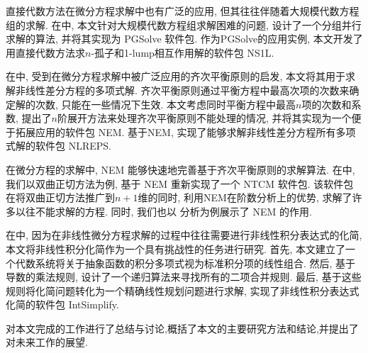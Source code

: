 直接代数方法在微分方程求解中也有广泛的应用, 但其往往伴随着大规模代数方程组的求解. 在中, 本文针对大规模代数方程组求解困难的问题, 设计了一个分组并行求解的算法, 并将其实现为 PGSolve 软件包. 作为PGSolve的应用实例, 本文开发了用直接代数方法求$n$-孤子和1-lump相互作用解的软件包 NS1L. 

在中, 受到在微分方程求解中被广泛应用的齐次平衡原则的启发, 本文将其用于求解非线性差分方程的多项式解. 齐次平衡原则通过平衡方程中最高次项的次数来确定解的次数, 只能在一些情况下生效. 本文考虑同时平衡方程中最高$n$项的次数和系数, 提出了$n$阶展开方法来处理齐次平衡原则不能处理的情况, 并将其实现为一个便于拓展应用的软件包 NEM. 基于NEM, 实现了能够求解非线性差分方程所有多项式解的软件包 NLREPS. 

在微分方程的求解中, NEM 能够快速地完善基于齐次平衡原则的求解算法. 在中, 我们以双曲正切方法为例, 基于 NEM 重新实现了一个 NTCM 软件包. 该软件包在将双曲正切方法推广到$n+1$维的同时, 利用NEM在阶数分析上的优势, 求解了许多以往不能求解的方程. 同时, 我们也以 \Painleve{} 分析为例展示了 NEM 的作用. 

在中, 因为在非线性微分方程求解的过程中往往需要进行非线性积分表达式的化简, 本文将非线性积分化简作为一个具有挑战性的任务进行研究. 首先, 本文建立了一个代数系统将关于抽象函数的积分多项式视为标准积分项的线性组合. 然后, 基于导数的乘法规则, 设计了一个递归算法来寻找所有的二项合并规则. 最后, 基于这些规则将化简问题转化为一个精确线性规划问题进行求解, 实现了非线性积分表达式化简的软件包 IntSimplify. 

对本文完成的工作进行了总结与讨论,概括了本文的主要研究方法和结论,并提出了对未来工作的展望.
